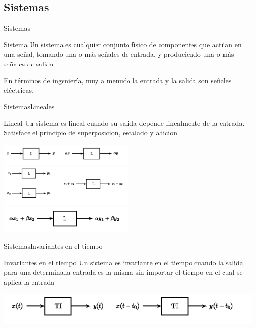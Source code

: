 \documentclass{beamer}
\begin{document}
\begin{darkframes}
   \subsection{Sistemas}
   \begin{frame}{Sistemas}
      \begin{block}{Sistema}
         Un sistema es cualquier conjunto físico de componentes que actúan en una señal, tomando una o más señales de entrada, y produciendo una o más señales de salida.
      \end{block}
         En términos de ingeniería, muy a menudo la entrada y la salida son señales eléctricas.
      \vfill
   \end{frame}
   \begin{frame}{Sistemas}{Lineales}
      \begin{block}{Lineal}
         Un sistema es lineal cuando su salida depende linealmente de la entrada.
         Satisface el principio de superposicion, escalado y adicion
      \end{block}
      \center\includegraphics[width=0.5\textwidth]{1_clase/superposicion1}
      \center\includegraphics[width=0.5\textwidth]{1_clase/superposicion2}
      \center\includegraphics[width=0.5\textwidth]{1_clase/superposicion3}
      \vfill
   \end{frame}
   \begin{frame}{Sistemas}{Invariantes en el tiempo}
      \begin{block}{Invariantes en el tiempo}
         Un sistema es invariante en el tiempo cuando la salida para una determinada entrada es la misma sin importar el tiempo en el cual se aplica la entrada
      \end{block}
      \center\includegraphics[width=1\textwidth]{1_clase/invariante_en_tiempo}

\end{frame}
\end{darkframes}
\end{document}
